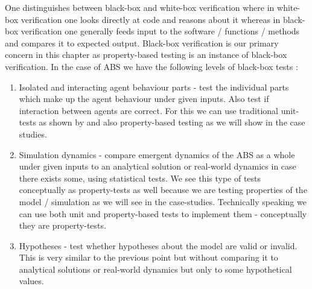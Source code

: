 One distinguishes between black-box and white-box verification where in white-box verification one looks directly at code and reasons about it whereas in black-box verification one generally feeds input to the software / functions / methods and compares it to expected output. Black-box verification is our primary concern in this chapter as property-based testing is an instance of black-box verification. In the case of ABS we have the following levels of black-box tests \cite{nguyen_testing_2011}: %
\begin{enumerate}
	\item Isolated and interacting agent behaviour parts - test the individual parts which make up the agent behaviour under given inputs. Also test if interaction between agents are correct. For this we can use traditional unit-tests as shown by \cite{collier_test-driven_2013} and also property-based testing as we will show in the case studies.
	\item Simulation dynamics - compare emergent dynamics of the ABS as a whole under given inputs to an analytical solution or real-world dynamics in case there exists some, using statistical tests. We see this type of tests conceptually as property-tests as well because we are testing properties of the model / simulation as we will see in the case-studies. Technically speaking we can use both unit and property-based tests to implement them - conceptually they are property-tests.
	\item Hypotheses - test whether hypotheses about the model are valid or invalid. This is very similar to the previous point but without comparing it to analytical solutions or real-world dynamics but only to some hypothetical values.
\end{enumerate}
